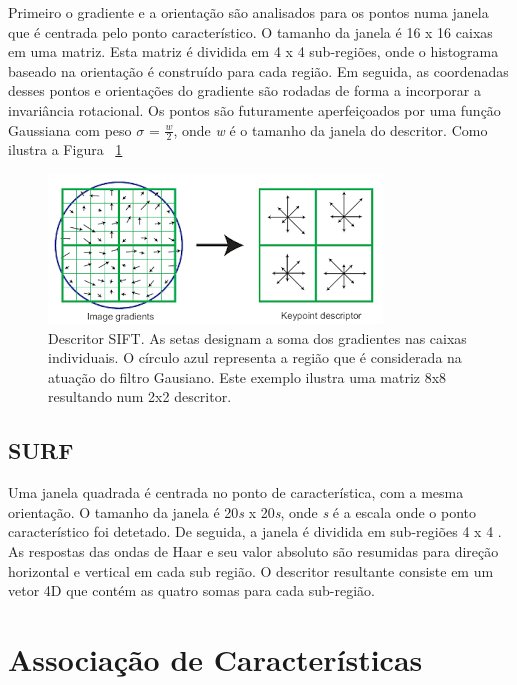 Primeiro o gradiente e a orientação são analisados para os pontos numa janela que é centrada pelo ponto característico. O tamanho da janela é 16 x 16 caixas em uma matriz. Esta matriz é dividida em 4 x 4 sub-regiões, onde o histograma baseado na orientação é construído para cada região. Em seguida, as coordenadas desses pontos e orientações do gradiente são rodadas de forma a incorporar a invariância rotacional. Os pontos são futuramente aperfeiçoados por uma função Gaussiana com peso $\sigma$ = $\frac{w}{2}$, onde \textit{w} é o tamanho da janela do descritor. Como ilustra a Figura ~\ref{fig:siftdescriptor}

\begin{figure}[h!]
	\centering
	\includegraphics[width=0.7\linewidth]{figures/SIFTdescriptor}
	\caption{Descritor SIFT. As setas designam a soma dos gradientes nas caixas individuais. O círculo azul representa a região que é considerada na atuação do filtro Gausiano. Este exemplo ilustra uma matriz 8x8 resultando num 2x2 descritor. \cite{VisualOdometryRodasVehicles}}
	\label{fig:siftdescriptor}
\end{figure}

\subsection{SURF}

Uma janela quadrada é centrada no ponto de característica, com a mesma orientação. O tamanho da janela é 20\textit{s} x 20\textit{s}, onde \textit{s} é a escala onde o ponto característico foi detetado. De seguida, a janela é dividida em sub-regiões 4 x 4 . As respostas das ondas de Haar e seu valor absoluto são resumidas para direção horizontal e vertical em cada sub região. O descritor resultante consiste em um vetor 4D que contém as quatro somas para cada sub-região.


\section{Associação de Características}


